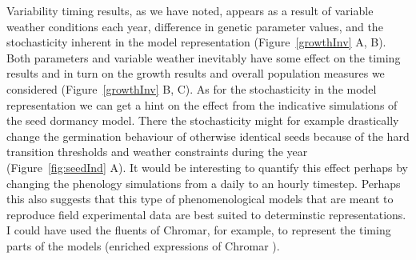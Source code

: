 Variability timing results, as we have noted, appears as a result of variable
weather conditions each year, difference in genetic parameter values, and the
stochasticity inherent in the model representation (Figure~\ref{growthInv} A,
B). Both parameters and variable weather inevitably have some effect on the
timing results and in turn on the growth results and overall population measures
we considered (Figure~\ref{growthInv} B, C). As for the stochasticity in the
model representation we can get a hint on the effect from the indicative
simulations of the seed dormancy model. There the stochasticity might for
example drastically change the germination behaviour of otherwise identical
seeds because of the hard transition thresholds and weather constraints during
the year (Figure~\ref{fig:seedInd} A). It would be interesting to quantify this
effect perhaps by changing the phenology simulations from a daily to an hourly
timestep. Perhaps this also suggests that this type of phenomenological models
that are meant to reproduce field experimental data are best suited to
determinstic representations. I could have used the fluents of Chromar, for
example, to represent the timing parts of the models (enriched expressions of
Chromar ).

